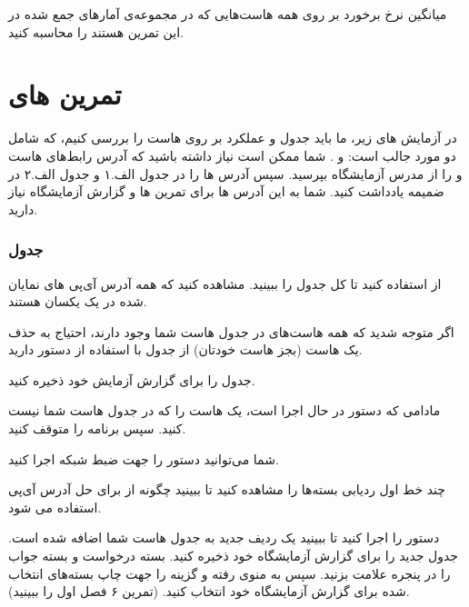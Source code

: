 \documentclass{../UTNetLabFa}
\begin{document}
	
	
	\begin{report}
		\item میانگین نرخ برخورد بر روی همه هاست‌هایی که در مجموعه‌ی آمارهای جمع شده در این تمرین هستند را محاسبه کنید.		
	\end{report}
	
	
\part{تمرین های }
	در آزمایش های زیر، ما باید جدول  و عملکرد  بر روی هاست را بررسی کنیم، که شامل دو مورد جالب است: \mbox{} و \mbox{}. شما ممکن است نیاز داشته باشید که آدرس  رابط‌های هاست و  را از مدرس آزمایشگاه بپرسید. سپس آدرس‌  ها را در جدول الف.۱ و جدول الف.۲ در ضمیمه یادداشت کنید. شما به این آدرس  ها برای تمرین ها و گزارش آزمایشگاه نیاز دارید.
	\section{جدول }
		از  استفاده کنید تا کل جدول  را ببینید. مشاهده کنید که همه آدرس آی‌پی های نمایان شده در یک  یکسان هستند. 
		
		اگر متوجه شدید که همه هاست‌های  در جدول  هاست شما وجود دارند، احتیاج به حذف یک هاست  (بجز هاست خودتان) از جدول با استفاده از دستور  دارید.
		
		جدول  را برای گزارش آزمایش خود ذخیره کنید.
		
		مادامی که دستور  در حال اجرا است، یک هاست  را که در جدول  هاست شما نیست  کنید. سپس برنامه  را متوقف کنید.
		
		شما می‌توانید دستور  را جهت ضبط شبکه اجرا کنید.
		
		چند خط اول ردیابی بسته‌ها را مشاهده کنید تا ببینید چگونه از  برای حل آدرس آی‌پی استفاده می شود.
		
		دستور  را اجرا کنید تا ببینید یک ردیف جدید به جدول  هاست شما اضافه شده است. جدول  جدید را برای گزارش آزمایشگاه خود ذخیره کنید.
		بسته درخواست  و بسته جواب  را در پنجره  علامت بزنید. سپس به منوی  رفته و گزینه  را جهت چاپ بسته‌های انتخاب شده برای گزارش آزمایشگاه خود انتخاب کنید. (تمرین ۶ فصل اول را ببینید).
	
\end{document}
